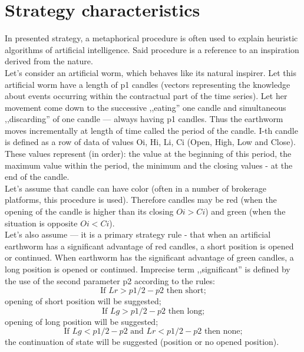 \documentclass[runningheads,a4paper]{llncs}
\begin{document}
\section{Strategy characteristics}
In presented strategy, a metaphorical procedure is often used to explain heuristic algorithms of artificial intelligence. Said procedure is a reference to an inspiration derived from the nature.\\

Let's consider an artificial worm, which behaves like its natural inspirer. Let this artificial worm have a length of p1 candles (vectors representing the knowledge about events occurring within the contractual part of the time series). Let her movement come down to the successive ,,eating'' one candle and simultaneous ,,discarding'' of one candle --- always having p1 candles. Thus the earthworm moves incrementally at length of time called the period of the candle. I-th candle is  defined as a row of data of values  Oi, Hi, Li, Ci (Open, High, Low and Close). These values represent (in order): the value at the beginning of this period, the maximum value within the period, the minimum and the closing values - at the end of the candle.\\
Let's assume that candle can have color (often in a number of brokerage platforms, this procedure is used). Therefore candles may be red (when the opening of the candle is higher than its closing $Oi>Ci$) and green (when the situation is opposite $Oi <Ci$).\\
Let's also assume --- it is a primary strategy rule - that when an artificial earthworm has a significant advantage of red candles, a short position is opened or continued. When earthworm has the significant advantage of green candles, a long position is opened or continued. Imprecise term ,,significant'' is defined by the use of the second parameter p2 according to the rules:
\begin{equation}
\text{If }  Lr > p1/2 -p2 \text{ then short;}
\end{equation}
opening of short position will be suggested;
\begin{equation}
\text{If }  Lg > p1/2 -p2 \text{ then long;}
\end{equation}
opening of long position will be suggested;
\begin{equation}
\text{If }  Lg < p1/2 -p2 \text{ and } Lr< p1/2-p2 \text{ then none;}
\label{eq:eq3}
\end{equation}
the continuation of state will be suggested (position or no opened position).\\
\end{document}
